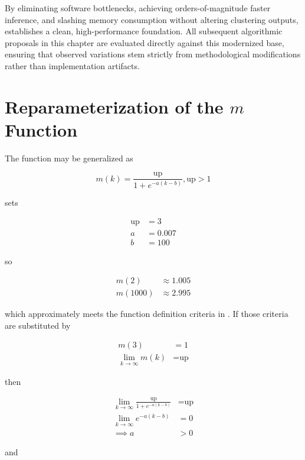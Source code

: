 By eliminating software bottlenecks, achieving orders-of-magnitude faster inference, and slashing memory consumption without altering clustering outputs,  establishes a clean, high-performance foundation. All subsequent algorithmic proposals in this chapter are evaluated directly against this modernized base, ensuring that observed variations stem strictly from methodological modifications rather than implementation artifacts.

\section{Reparameterization of the \texorpdfstring{$m$}{m} Function}
\label{sec:reparameterization_of_m_function}

The function may be generalized as

\begin{equation} \label{eq:generalized_m}
    m(k) = \frac{\text{up}}{1 + e^{-a(k-b)}}, \text{up} > 1
\end{equation}

\MicroTEDAClus sets

\begin{align}
    \text{up} &= 3 \\
    a &= 0.007 \\
    b &= 100
\end{align}

so

\begin{align}
    m(2) &\approx 1.005 \\
    m(1000) &\approx 2.995
\end{align}

which approximately meets the function definition criteria in \cite{maia2020evolvclus}. If those criteria are substituted by

\begin{align}
    m(3) &= 1 \\
    \lim_{k \to \infty} m(k) &= \text{up}
\end{align}

then

\begin{align}
    \lim_{k \to \infty} \frac{\text{up}}{1 + e^{-a(k-b)}} &= \text{up} \\
    \lim_{k \to \infty} e^{-a(k-b)} &= 0 \\
    \implies a &> 0
\end{align}

and

